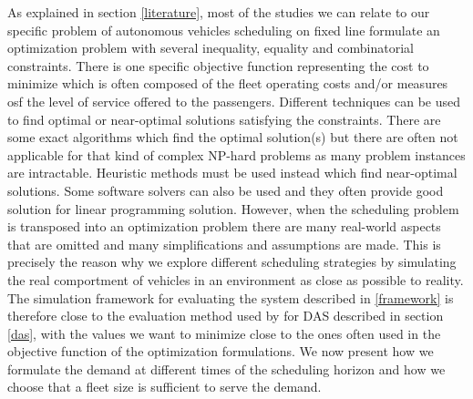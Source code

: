 \documentclass[12pt,a4paper]{article}
\begin{document}
As explained in section \ref{literature}, most of the studies we can relate to our specific problem of autonomous vehicles scheduling on fixed line formulate an optimization problem with  
several inequality, equality and combinatorial constraints. There is one specific objective function representing the cost to minimize which is often composed of the fleet operating costs and/or measures osf the level of service offered to the passengers. Different techniques can be used to find optimal or near-optimal solutions satisfying the constraints. There are some exact algorithms which find the optimal solution(s) but there are often not applicable for that kind of complex NP-hard problems as many problem instances are intractable. Heuristic methods  must be used instead which find near-optimal solutions. Some software solvers can also be used and they often provide good solution for linear programming solution. However, when the scheduling problem is transposed into an optimization problem there are many real-world aspects that are omitted and many simplifications and assumptions are made. This is precisely the reason why we explore different scheduling strategies by simulating the real comportment of vehicles in an environment as close as possible to reality. The simulation framework for evaluating the system described in \ref{framework} is therefore close to the evaluation method used by \cite{evaluation} for DAS described in section \ref{das}, with the values we want to minimize close to the ones often used in the objective function of the optimization formulations. We now present how we formulate the demand at different times of the scheduling horizon and how we choose that a fleet size is sufficient to serve the demand.
\end{document}
